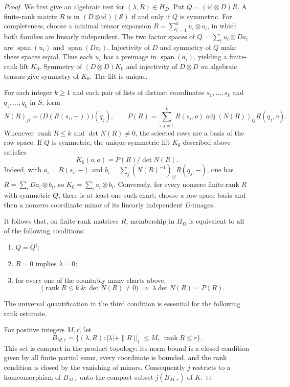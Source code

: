 \documentclass[11pt]{article}
\theoremstyle{definition}
\theoremstyle{remark}
\begin{document}
\begin{proof}
We first give an algebraic test for $(\lambda,R)\in H_D$. Put
$Q=(\mathrm{id}\otimes D)R$. A finite-rank matrix $R$ is in
$(D\otimes\mathrm{id})(\mathcal S)$ if and only if $Q$ is symmetric.
For completeness, choose a minimal tensor expansion
$R=\sum_{i=1}^k u_i\otimes a_i$, in which both families are linearly
independent. The two factor spaces of
$Q=\sum_i u_i\otimes Da_i$ are $\operatorname{span}(u_i)$ and
$\operatorname{span}(Da_i)$. Injectivity of $D$ and symmetry of $Q$ make
these spaces equal. Thus each $u_i$ has a preimage in
$\operatorname{span}(a_i)$, yielding a finite-rank lift $K_0$. Symmetry of
$(D\otimes D)K_0$ and injectivity of $D\otimes D$ on algebraic tensors
give symmetry of $K_0$. The lift is unique.

For each integer $k\geq1$ and each pair of lists of distinct coordinates
$s_1,\ldots,s_k$ and $q_1,\ldots,q_k$ in $S$, form
\[
 N(R)_{ji}=\bigl(D(R(s_i,-))\bigr)(q_j),
 \qquad
 P(R)=\sum_{i,j=1}^k R(s_i,o)\operatorname{adj}(N(R))_{ij}R(q_j,o).
\]
Whenever $\operatorname{rank}R\leq k$ and $\det N(R)\ne0$, the selected
rows are a basis of the row space. If $Q$ is symmetric, the unique
symmetric lift $K_0$ described above satisfies
\[
 K_0(o,o)=P(R)/\det N(R).
\]
Indeed, with $a_i=R(s_i,-)$ and
$b_i=\sum_j(N(R)^{-1})_{ij}R(q_j,-)$, one has
$R=\sum_i Da_i\otimes b_i$, so $K_0=\sum_i a_i\otimes b_i$.
Conversely, for every nonzero finite-rank $R$ with symmetric $Q$, there
is at least one such chart: choose a row-space basis and then a nonzero
coordinate minor of its linearly independent $D$-images.

It follows that, on finite-rank matrices $R$, membership in $H_D$ is
equivalent to all of the following conditions:
\begin{enumerate}
\item $Q=Q^{\mathsf t}$;
\item $R=0$ implies $\lambda=0$;
\item for every one of the countably many charts above,
\[
 \bigl(\operatorname{rank}R\leq k\ \&\ \det N(R)\ne0\bigr)
 \ \Longrightarrow\ \lambda\det N(R)=P(R).
\]
\end{enumerate}
The universal quantification in the third condition is essential for
the following rank estimate.

For positive integers $M,r$, let
\[
 B_{M,r}=\{(\lambda,R):|\lambda|+\|R\|_1\leq M,
                       \ \operatorname{rank}R\leq r\}.
\]
This set is compact in the product topology: its norm bound is a closed
condition given by all finite partial sums, every coordinate is bounded,
and the rank condition is closed by the vanishing of minors. Consequently
$j$ restricts to a homeomorphism of $B_{M,r}$ onto the compact subset
$j(B_{M,r})$ of $K$.


\end{proof}
\end{document}
